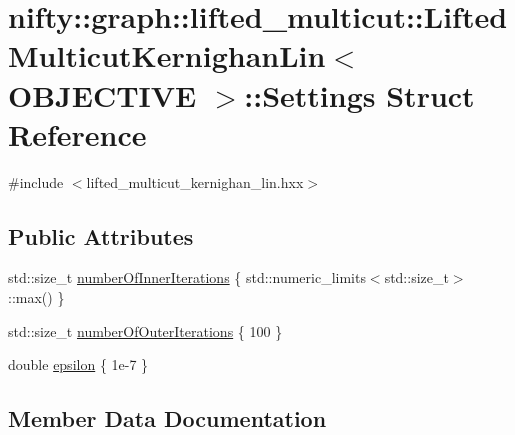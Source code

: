 \hypertarget{structnifty_1_1graph_1_1lifted__multicut_1_1LiftedMulticutKernighanLin_1_1Settings}{}\section{nifty\+:\+:graph\+:\+:lifted\+\_\+multicut\+:\+:Lifted\+Multicut\+Kernighan\+Lin$<$ O\+B\+J\+E\+C\+T\+I\+V\+E $>$\+:\+:Settings Struct Reference}
\label{structnifty_1_1graph_1_1lifted__multicut_1_1LiftedMulticutKernighanLin_1_1Settings}


{\ttfamily \#include $<$lifted\+\_\+multicut\+\_\+kernighan\+\_\+lin.\+hxx$>$}

\subsection*{Public Attributes}
\begin{DoxyCompactItemize}
\item 
std\+::size\+\_\+t \hyperlink{structnifty_1_1graph_1_1lifted__multicut_1_1LiftedMulticutKernighanLin_1_1Settings_a9b5f462a1c894c0f77ccdeff5a757241}{number\+Of\+Inner\+Iterations} \{ std\+::numeric\+\_\+limits$<$std\+::size\+\_\+t$>$\+::max() \}
\item 
std\+::size\+\_\+t \hyperlink{structnifty_1_1graph_1_1lifted__multicut_1_1LiftedMulticutKernighanLin_1_1Settings_a30a6000358086c39d4b403f3ea7aef76}{number\+Of\+Outer\+Iterations} \{ 100 \}
\item 
double \hyperlink{structnifty_1_1graph_1_1lifted__multicut_1_1LiftedMulticutKernighanLin_1_1Settings_a817c535759f8338e7a3c01d99a42ba07}{epsilon} \{ 1e-\/7 \}
\end{DoxyCompactItemize}


\subsection{Member Data Documentation}
\hypertarget{structnifty_1_1graph_1_1lifted__multicut_1_1LiftedMulticutKernighanLin_1_1Settings_a817c535759f8338e7a3c01d99a42ba07}{}
